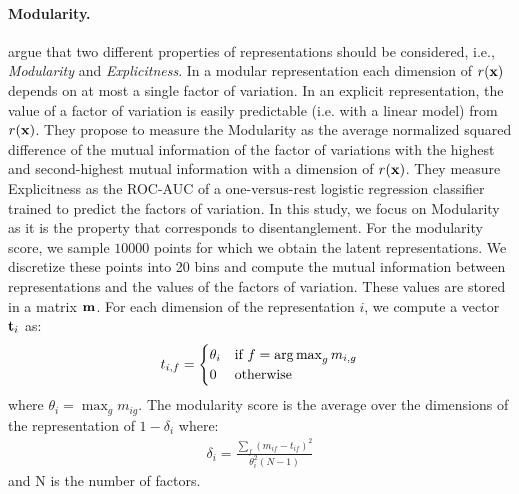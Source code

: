 \paragraph{Modularity.}
\citet{ridgeway2018learning} argue that two different properties of representations should be considered, i.e., \emph{Modularity} and \emph{Explicitness}.
In a modular representation each dimension of $r({\mathbf{x}})$ depends on at most a single factor of variation. 
In an explicit representation, the value of a factor of variation is easily predictable (i.e. with a linear model) from $r({\mathbf{x}})$. 
They propose to measure the Modularity as the average normalized squared difference of the mutual information of the factor of variations with the highest and second-highest mutual information with a dimension of $r({\mathbf{x}})$.
They measure Explicitness as the ROC-AUC of a one-versus-rest logistic regression classifier trained to predict the factors of variation.
In this study, we focus on Modularity as it is the property that corresponds to disentanglement.
For the modularity score, we sample $\num{10000}$ points for which we obtain the latent representations. 
We discretize these points into 20 bins and compute the mutual information between representations and the values of the factors of variation. 
These values are stored in a matrix ${\mathbf{m}}$. 
For each dimension of the representation $i$, we compute a vector ${\mathbf{t}}_i$ as:
\begin{align*}
t_{i,f} = \begin{cases} \theta_i & \mbox{if } f=\operatorname*{arg\,max}_g m_{i,g}\\ 0 & \mbox{otherwise}\end{cases}
\end{align*}
 where $\theta_i = \max_g m_{ig}$. The modularity score is the average over the dimensions of the representation of $1-\delta_i$ where:
 \begin{align*}
 \delta_i = \frac{\sum_f (m_{if}-t_{if})^2}{\theta_i^2(N-1)}
 \end{align*}
 and N is the number of factors. 
 
